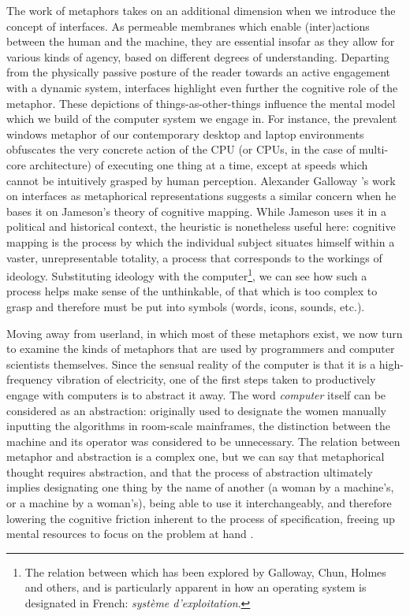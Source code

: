 The work of metaphors takes on an additional dimension when we introduce the concept of interfaces. As permeable membranes which enable (inter)actions between the human and the machine, they are essential insofar as they allow for various kinds of agency, based on different degrees of understanding. Departing from the physically passive posture of the reader towards an active engagement with a dynamic system, interfaces highlight even further the cognitive role of the metaphor. These depictions of things-as-other-things influence the mental model which we build of the computer system we engage in. For instance, the prevalent windows metaphor of our contemporary desktop and laptop environments obfuscates the very concrete action of the CPU (or CPUs, in the case of multi-core architecture) of executing one thing at a time, except at speeds which cannot be intuitively grasped by human perception. Alexander Galloway 's work on interfaces as metaphorical representations suggests a similar concern when he bases it on Jameson's theory of cognitive mapping. While Jameson uses it in a political and historical context, the heuristic is nonetheless useful here: cognitive mapping is the process by which the individual subject situates himself within a vaster, unrepresentable totality, a process that corresponds to the workings of ideology. Substituting ideology with the computer\footnote{The relation between which has been explored by Galloway, Chun, Holmes and others, and is particularly apparent in how an operating system is designated in French: \emph{système d'exploitation}.}, we can see how such a process helps make sense of the unthinkable, of that which is too complex to grasp and therefore must be put into symbols (words, icons, sounds, etc.).

Moving away from userland, in which most of these metaphors exist, we now turn to examine the kinds of metaphors that are used by programmers and computer scientists themselves. Since the sensual reality of the computer is that it is a high-frequency vibration of electricity, one of the first steps taken to productively engage with computers is to abstract it away. The word \emph{computer} itself can be considered as an abstraction: originally used to designate the women manually inputting the algorithms in room-scale mainframes, the distinction between the machine and its operator was considered to be unnecessary. The relation between metaphor and abstraction is a complex one, but we can say that metaphorical thought requires abstraction, and that the process of abstraction ultimately implies designating one thing by the name of another (a woman by a machine's, or a machine by a woman's), being able to use it interchangeably, and therefore lowering the cognitive friction inherent to the process of specification, freeing up mental resources to focus on the problem at hand \citep{chun_software_2005}.

